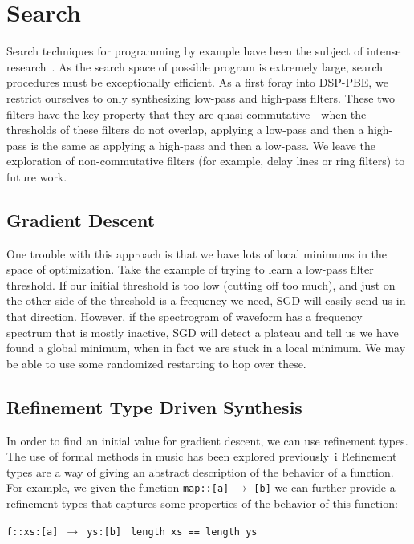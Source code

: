 \section{Search}
\label{sec:search}

Search techniques for programming by example have been the subject of intense research~\cite{?,?,?}.
As the search space of possible program is extremely large, search procedures must be exceptionally efficient. 
As a first foray into DSP-PBE, we restrict ourselves to only synthesizing low-pass and high-pass filters.
These two filters have the key property that they are quasi-commutative - when the thresholds of these filters do not overlap, applying a low-pass and then a high-pass is the same as applying a high-pass and then a low-pass.
We leave the exploration of non-commutative filters (for example, delay lines or ring filters) to future work.

\subsection{Gradient Descent}

One trouble with this approach is that we have lots of local minimums in the space of optimization.
Take the example of trying to learn a low-pass filter threshold.
If our initial threshold is too low (cutting off too much), and just on the other side of the threshold is a frequency we need, SGD will easily send us in that direction.
However, if the spectrogram of waveform has a frequency spectrum that is mostly inactive, SGD will detect a plateau and tell us we have found a global minimum, when in fact we are stuck in a local minimum.
We may be able to use some randomized restarting to hop over these.

\subsection{Refinement Type Driven Synthesis}

In order to find an initial value for gradient descent, we can use refinement types.
The use of formal methods in music has been explored previously~i
Refinement types are a way of giving an abstract description of the behavior of a function. 
For example, we given the function 
%
\texttt{map::[a]} $\to$ \texttt{[b]}
%
we can further provide a refinement types that captures some properties of the behavior of this function:

\texttt{f::xs:[a]} $\,\to\,$ \texttt{ys:[b]} \textbar \texttt{ length xs == length ys}

